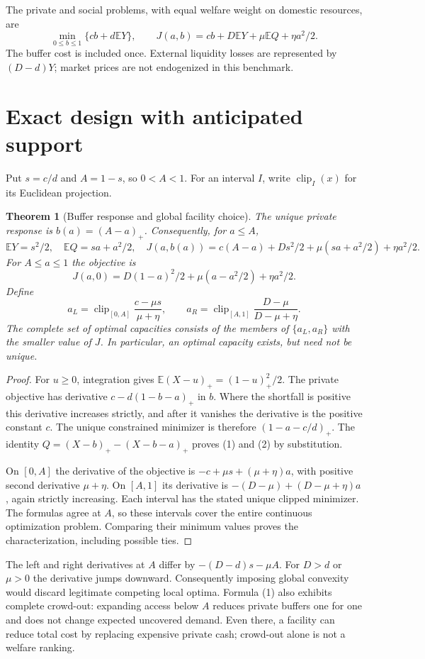 \documentclass[11pt]{article}
\newtheorem{theorem}{Theorem}
\theoremstyle{remark}
\newcommand{\E}{\mathbb E}
\newcommand{\clip}{\operatorname{clip}}
\begin{document}
The private and social problems, with equal welfare weight on domestic
resources, are
\[
 \min_{0\leq b\leq1}\{cb+d\E Y\},\qquad
 J(a,b)=cb+D\E Y+\mu\E Q+\eta a^2/2.
\]
The buffer cost is included once. External liquidity losses are represented
by $(D-d)Y$; market prices are not endogenized in this benchmark.

\section{Exact design with anticipated support}
Put $s=c/d$ and $A=1-s$, so $0<A<1$. For an interval $I$, write
$\clip_I(x)$ for its Euclidean projection.
\begin{theorem}[Buffer response and global facility choice]
The unique private response is $b(a)=(A-a)_+$. Consequently, for $a\leq A$,
\[
 \E Y=s^2/2,\quad \E Q=sa+a^2/2,\quad
 J(a,b(a))=c(A-a)+Ds^2/2+\mu(sa+a^2/2)+\eta a^2/2.
 \tag{1}
\]
For $A\leq a\leq1$ the objective is
\[
 J(a,0)=D(1-a)^2/2+\mu(a-a^2/2)+\eta a^2/2. \tag{2}
\]
Define
\[
 a_L=\clip_{[0,A]}\frac{c-\mu s}{\mu+\eta},\qquad
 a_R=\clip_{[A,1]}\frac{D-\mu}{D-\mu+\eta}.
\]
The complete set of optimal capacities consists of the members of
$\{a_L,a_R\}$ with the smaller value of $J$. In particular, an optimal
capacity exists, but need not be unique.
\end{theorem}
\begin{proof}
For $u\geq0$, integration gives
$\E(X-u)_+=(1-u)_+^2/2$. The private objective has derivative
$c-d(1-b-a)_+$ in $b$. Where the shortfall is positive this derivative
increases strictly, and after it vanishes the derivative is the positive
constant $c$. The unique constrained minimizer is therefore $(1-a-c/d)_+$.
The identity
$Q=(X-b)_+-(X-b-a)_+$ proves (1) and (2) by substitution.

On $[0,A]$ the derivative of the objective is
$-c+\mu s+(\mu+\eta)a$, with positive second derivative $\mu+\eta$.
On $[A,1]$ its derivative is
$-(D-\mu)+(D-\mu+\eta)a$, again strictly increasing. Each interval has
the stated unique clipped minimizer. The formulas agree at $A$, so these
intervals cover the entire continuous optimization problem. Comparing their
minimum values proves the characterization, including possible ties.
\end{proof}

The left and right derivatives at $A$ differ by $-(D-d)s-\mu A$. For $D>d$ or $\mu>0$
the derivative jumps downward. Consequently imposing global convexity
would discard legitimate competing local optima. Formula (1) also exhibits
complete crowd-out: expanding access below $A$ reduces private buffers
one for one and does not change expected uncovered demand. Even there,
a facility can reduce total cost by replacing expensive private cash;
crowd-out alone is not a welfare ranking.
\end{document}
